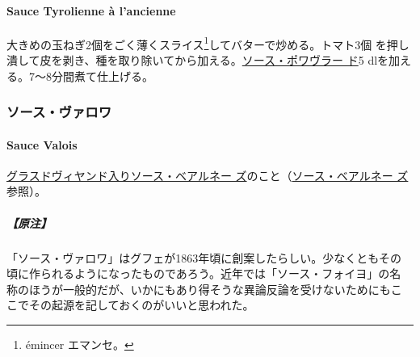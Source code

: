 \begin{recette}
\hypertarget{sauce-tyrolienne-uxe0-lancienne}{%
\paragraph{Sauce Tyrolienne à
l'ancienne}\label{sauce-tyrolienne-uxe0-lancienne}}


大きめの玉ねぎ2個をごく薄くスライス\footnote{émincer エマンセ。}してバターで炒める。トマト3個
を押し潰して皮を剥き、種を取り除いてから加える。\protect\hyperlink{sauce-poivrade}{ソース・ポワヴラー
ド}5 dlを加える。7〜8分間煮て仕上げる。

\maeaki

\hypertarget{ux30bdux30fcux30b9ux30f4ux30a1ux30edux30ef}{%
\subsubsection{ソース・ヴァロワ}\label{ux30bdux30fcux30b9ux30f4ux30a1ux30edux30ef}}

\hypertarget{sauce-valois}{%
\paragraph{Sauce Valois}\label{sauce-valois}}


\protect\hyperlink{sauce-bearnaise-a-la-glace-de-viande}{グラスドヴィヤンド入りソース・ベアルネー
ズ}のこと（\protect\hyperlink{sauce-bearnaise}{ソース・ベアルネー
ズ}参照）。

\hypertarget{ux539fux6ce8-19}{%
\subparagraph{【原注】}\label{ux539fux6ce8-19}}

「ソース・ヴァロワ」はグフェが1863年頃に創案したらしい。少なくともその
頃に作られるようになったものであろう。近年では「ソース・フォイヨ」の名
称のほうが一般的だが、いかにもあり得そうな異論反論を受けないためにもこ
こでその起源を記しておくのがいいと思われた。

\maeaki

\hypertarget{ux30f4ux30a7ux30cdux30c4ux30a3ux30a2ux98a8148ux30bdux30fcux30b9}{%
}
\end{recette}
